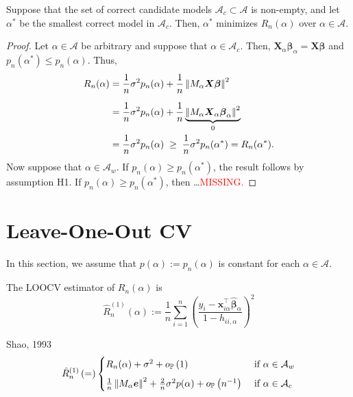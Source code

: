 \documentclass[12pt, letter paper]{article}
\newcommand{\1}{\mathmybb{1}}
\newcommand{\0}{\emptyset}
\newcommand{\prob}{\mathbb{P}}
\newcommand{\paren}[1]{\left(#1 \right)}
\newcommand{\norm}[1]{\left|\hspace{-1pt}\left|#1 \right|\hspace{-1pt}\right|}
\newcommand{\normsq}[1]{\norm{#1}^{2}}
\newcommand{\Acal}{\mathcal{A}}
\newcommand{\X}{\boldsymbol{X}}
\newcommand{\x}{\boldsymbol{x}}
\newcommand{\e}{\boldsymbol{e}}
\newcommand{\bbeta}{\boldsymbol{\beta}}
\newcommand{\bbetahat}{\boldsymbol{\hat{\beta}}}
\newcommand{\loocv}[1]{\hat{R}^{(1)}_{n}\paren{#1}}
\newcommand{\op}[1]{o_{\prob}\paren{#1}}
\begin{document}
\begin{proposition}{}
    Suppose that the set of correct candidate models \(\Acal_{c}\subset\Acal\) is non-empty, and let \(\alpha^{*}\) be the smallest correct model in \(\Acal_{c}\). Then, \(\alpha^{*}\) minimizes \(R_{n}(\alpha)\) over \(\alpha\in\Acal\).
\end{proposition}
\begin{proof}
    Let \(\alpha\in\Acal\) be arbitrary and suppose that \(\alpha\in\Acal_{c}\). Then, \(\X_{\alpha}\bbeta_{\alpha} = \X\bbeta\) and \(p_{n}(\alpha^{*})\leq p_{n}(\alpha)\). Thus,
    \begin{align*}
        R_{n}(\alpha) &= \frac{1}{n}\sigma^{2}p_{n}(\alpha) + \frac{1}{n}\normsq{M_{\alpha}\X\bbeta}\\[2mm]
        &= \frac{1}{n} \sigma^{2}p_{n}(\alpha) + \frac{1}{n}\underbrace{\normsq{M_{\alpha}\X_{\alpha}\bbeta_{\alpha}}}_{0}\\
        &= \frac{1}{n}\sigma^{2}p_{n}(\alpha)\; \geq \; \frac{1}{n}\sigma^{2}p_{n}(\alpha^{*}) = R_{n}(\alpha^{*}).
    \end{align*}
    Now suppose that \(\alpha\in\Acal_{w}\). If \(p_{n}(\alpha)\geq p_{n}(\alpha^{*})\), the result follows by assumption H1. If \(p_{n}(\alpha)\geq p_{n}(\alpha^{*})\), then \ldots \textcolor{red}{MISSING.}
\end{proof}

\section{Leave-One-Out CV~\cite{shao_linear_1993}}
In this section, we assume that \(p(\alpha):=p_n(\alpha)\) is constant for each \(\alpha\in\Acal\).
\begin{definition}
    The LOOCV estimator of \(R_{n}(\alpha)\) is 
    \[\loocv{\alpha}:= \frac{1}{n}\sum_{i=1}^{n}\paren{\frac{y_{i}-\x_{i\alpha}^{\top}\bbetahat_{\alpha}}{1-h_{ii,\alpha}}}^{2}\]
\end{definition}

\begin{proposition}[Lemma]{{Shao, 1993}}
    \[\loocv = \begin{cases}
        R_{n}(\alpha) + \sigma^{2} + \op{1} &\text{ if }\alpha\in\Acal_{w}\\[2mm]
        \frac{1}{n}\normsq{M_{\alpha}\e} + \frac{2}{n}\sigma^{2}p(\alpha) + \op{n^{-1}} &\text{ if }\alpha\in\Acal_{c}
    \end{cases}\]
\end{proposition}
\end{document}
